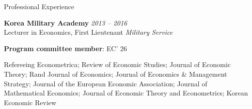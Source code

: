 
\begin{rSection}{Professional Experience}

{\bf Korea Military Academy} \hfill {\em 2013 -- 2016} \\[5pt] 
Lecturer in Economics, First Lieutenant \hfill {\em Military Service}

\medskip 

{\bf Program committee member}: EC' 26

\end{rSection}

\begin{rSection}{Refereeing}
	Econometrica; Review of Economic Studies; Journal of Economic Theory; Rand Journal of Economics; Journal of Economics \& Management Strategy; Journal of the European Economic Association; Journal of Mathematical Economics; Journal of Economic Theory and Econometrics; Korean Economic Review
\end{rSection}